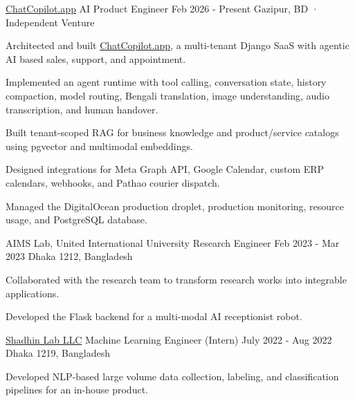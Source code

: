 \begin{cventries}
\cventry
    {\href{https://chatcopilot.app/}{ChatCopilot.app}} %
    {AI Product Engineer} %
    {Feb 2026 - Present} %
    {Gazipur, BD · Independent Venture} %
    {
      \begin{cvitems}
        \item{Architected and built \href{https://chatcopilot.app/}{ChatCopilot.app}, a multi-tenant Django SaaS with agentic AI based sales, support, and appointment.}
        \item{Implemented an agent runtime with tool calling, conversation state, history compaction, model routing, Bengali translation, image understanding, audio transcription, and human handover.}
        \item{Built tenant-scoped RAG for business knowledge and product/service catalogs using pgvector and multimodal embeddings.}
        \item{Designed integrations for Meta Graph API, Google Calendar, custom ERP calendars, webhooks, and Pathao courier dispatch.}
        \item{Managed the DigitalOcean production droplet, production monitoring, resource usage, and PostgreSQL database.}
      \end{cvitems}
    }


\cventry
  {AIMS Lab, United International University} %
  {Research Engineer} %
  {Feb 2023 - Mar 2023} %
  {Dhaka 1212, Bangladesh} %
{
  \begin{cvitems}
    \item{Collaborated with the research team to transform research works into integrable applications.}
    \item{Developed the Flask backend for a multi-modal AI receptionist robot.}
  \end{cvitems}
}


\cventry
    {\href{https://shadhinlab.com/}{Shadhin Lab LLC}} %
    {Machine Learning Engineer (Intern)} %
    {July 2022 - Aug 2022} %
    {Dhaka 1219, Bangladesh} %
    {
      \begin{cvitems}
        \item{Developed NLP-based large volume data collection, labeling, and classification pipelines for an in-house product.}
      \end{cvitems}
    }


\end{cventries}
